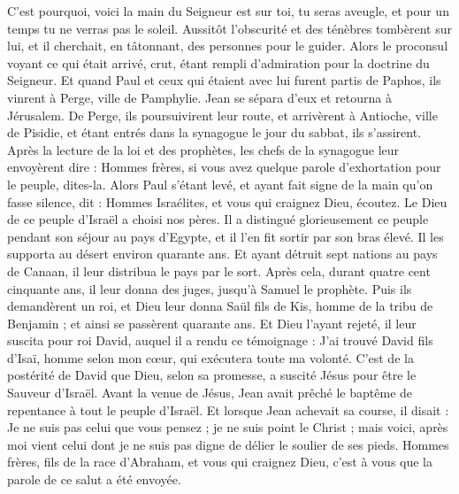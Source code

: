 \begin{multicols}{2}
C'est pourquoi, voici la main du Seigneur est sur toi, tu seras aveugle, et pour un temps tu ne verras pas le soleil. Aussitôt l’obscurité et des ténèbres tombèrent sur lui, et il cherchait, en tâtonnant, des personnes pour le guider.
Alors le proconsul voyant ce qui était arrivé, crut, étant rempli d'admiration pour la doctrine du Seigneur.
Et quand Paul et ceux qui étaient avec lui furent partis de Paphos, ils vinrent à Perge, ville de Pamphylie. Jean se sépara d’eux et retourna à Jérusalem.
De Perge, ils poursuivirent leur route, et arrivèrent à Antioche, ville de Pisidie, et étant entrés dans la synagogue le jour du sabbat, ils s'assirent.
Après la lecture de la loi et des prophètes, les chefs de la synagogue leur envoyèrent dire : Hommes frères, si vous avez quelque parole d'exhortation pour le peuple, dites-la.
Alors Paul s'étant levé, et ayant fait signe de la main qu'on fasse silence, dit : Hommes Israélites, et vous qui craignez Dieu, écoutez.
Le Dieu de ce peuple d'Israël a choisi nos pères. Il a distingué glorieusement ce peuple pendant son séjour au pays d’Egypte, et il l’en fit sortir par son bras élevé.
Il les supporta au désert environ quarante ans.
Et ayant détruit sept nations au pays de Canaan, il leur distribua le pays par le sort.
Après cela, durant quatre cent cinquante ans, il leur donna des juges, jusqu'à Samuel le prophète.
Puis ils demandèrent un roi, et Dieu leur donna Saül fils de Kis, homme de la tribu de Benjamin ; et ainsi se passèrent quarante ans.
Et Dieu l'ayant rejeté, il leur suscita pour roi David, auquel il a rendu ce témoignage : J’ai trouvé David fils d’Isaï, homme selon mon cœur, qui exécutera toute ma volonté.
C’est de la postérité de David que Dieu, selon sa promesse, a suscité Jésus pour être le Sauveur d’Israël.
Avant la venue de Jésus, Jean avait prêché le baptême de repentance à tout le peuple d'Israël.
Et lorsque Jean achevait sa course, il disait : Je ne suis pas celui que vous pensez ; je ne suis point le Christ ; mais voici, après moi vient celui dont je ne suis pas digne de délier le soulier de ses pieds.
Hommes frères, fils de la race d'Abraham, et vous qui craignez Dieu, c'est à vous que la parole de ce salut a été envoyée.

\end{multicols}
